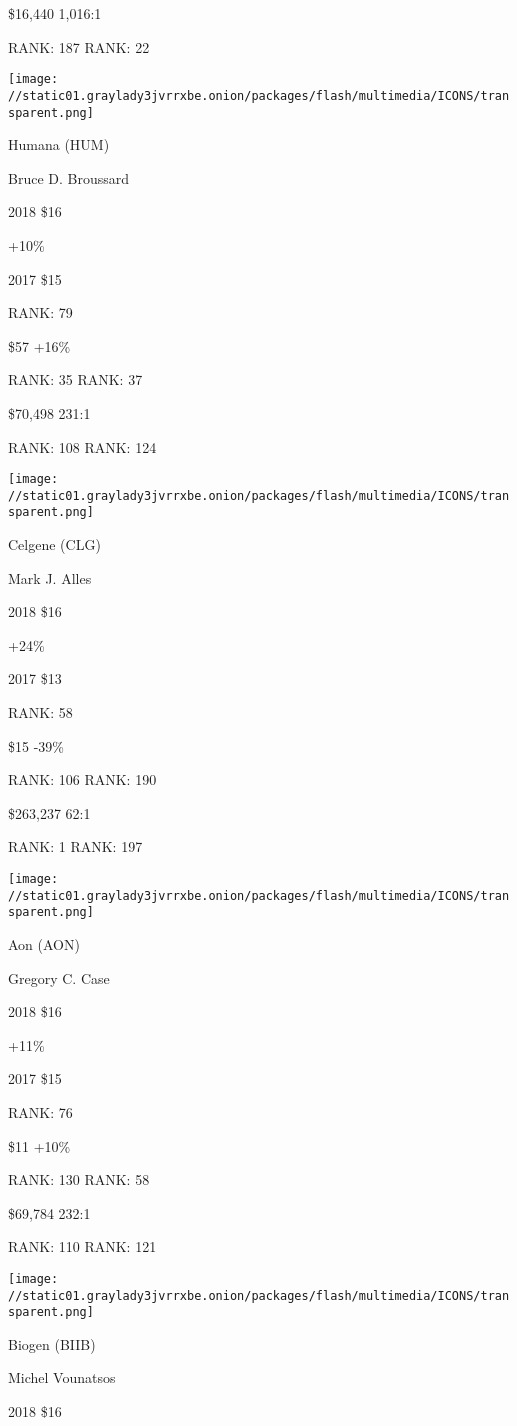  \$16,440 1,016:1

RANK: 187 RANK: 22

\texttt{[image: //static01.graylady3jvrrxbe.onion/packages/flash/multimedia/ICONS/transparent.png]}

Humana (HUM)

Bruce D. Broussard \protect\hyperlink{g-footnotes}{}

2018 \$16

 +10\%

2017 \$15

RANK: 79

 \$57 +16\%

RANK: 35 RANK: 37

 \$70,498 231:1

RANK: 108 RANK: 124

\texttt{[image: //static01.graylady3jvrrxbe.onion/packages/flash/multimedia/ICONS/transparent.png]}

Celgene (CLG)

Mark J. Alles \protect\hyperlink{g-footnotes}{}

2018 \$16

 +24\%

2017 \$13

RANK: 58

 \$15 -39\%

RANK: 106 RANK: 190

 \$263,237 62:1

RANK: 1 RANK: 197

\texttt{[image: //static01.graylady3jvrrxbe.onion/packages/flash/multimedia/ICONS/transparent.png]}

Aon (AON)

Gregory C. Case \protect\hyperlink{g-footnotes}{}

2018 \$16

 +11\%

2017 \$15

RANK: 76

 \$11 +10\%

RANK: 130 RANK: 58

 \$69,784 232:1

RANK: 110 RANK: 121

\texttt{[image: //static01.graylady3jvrrxbe.onion/packages/flash/multimedia/ICONS/transparent.png]}

Biogen (BIIB)

Michel Vounatsos \protect\hyperlink{g-footnotes}{}

2018 \$16

